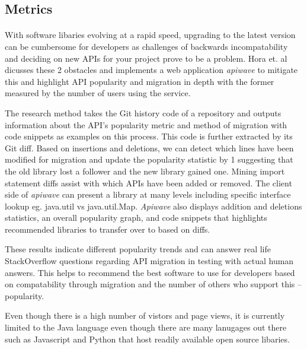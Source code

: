 \documentclass[12pt]{article}
\begin{document}


\subsection{Metrics}
\paragraph{}
With software libaries evolving at a rapid speed, upgrading to the latest version can be cumbersome for developers
as challenges of backwards incompatability and deciding on new APIs for your project prove to be a problem.
Hora et. al \cite{apiwave} dicusses these 2 obstacles and implements a web application \textit{apiwave} \cite{apiwavewebsite} to mitigate this and
highlight API popularity and migration in depth with the former measured by the number of users using the service.

The research method takes the Git history code of a repository and outputs information about the API's popularity metric 
and method of migration with code snippets as examples on this process.
This code is further extracted by its Git diff. 
Based on insertions and deletions, we can detect which lines have been modified for migration 
and update the popularity statistic by 1 suggesting that the old library lost a follower and the new library gained one.
Mining import statement diffs assist with which APIs have been added or removed.
The client side of \textit{apiwave} \cite{apiwavewebsite} can present a library at many levels including specific interface lookup eg. java.util vs java.util.Map.
\textit{Apiwave} also displays addition and deletions statistics, an overall popularity graph, 
and code snippets that highlights recommended libraries to transfer over to based on diffs.

These results indicate different popularity trends and can answer real life StackOverflow \cite{stackoverflow} 
questions regarding API migration in testing with actual human answers. 
This helps to recommend the best software to use for developers based on compatability through migration
and the number of others who support this -- popularity.

Even though there is a high number of vistors and page views, it is currently limited to the Java language even though there are many lanugages out there
such as Javascript and Python that host readily available open source libaries. 
\end{document}
